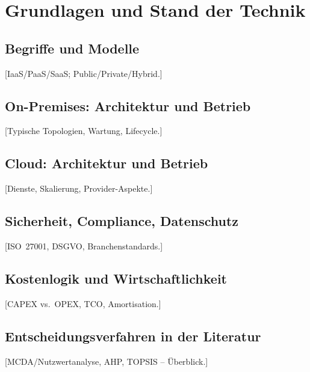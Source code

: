 \chapter{Grundlagen und Stand der Technik}

\section{Begriffe und Modelle}
[IaaS/PaaS/SaaS; Public/Private/Hybrid.]

\section{On-Premises: Architektur und Betrieb}
[Typische Topologien, Wartung, Lifecycle.]

\section{Cloud: Architektur und Betrieb}
[Dienste, Skalierung, Provider-Aspekte.]

\section{Sicherheit, Compliance, Datenschutz}
[ISO~27001, DSGVO, Branchenstandards.]

\section{Kostenlogik und Wirtschaftlichkeit}
[CAPEX vs.\ OPEX, TCO, Amortisation.]

\section{Entscheidungsverfahren in der Literatur}
[MCDA/Nutzwertanalyse, AHP, TOPSIS – Überblick.]
